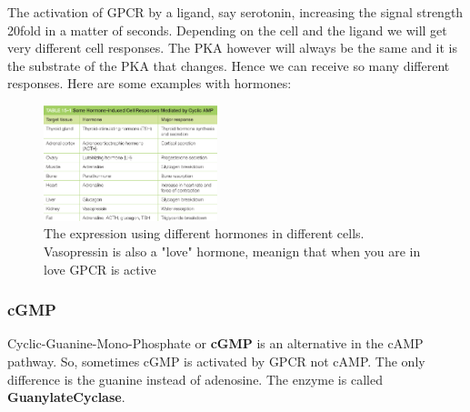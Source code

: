 \documentclass[../main.tex]{subfiles}
\begin{document}
The activation of \gls{GPCR} by a ligand, say serotonin, increasing the signal strength 20fold in a matter of seconds. Depending on the cell and the ligand we will get very different cell responses. The PKA however will always be the same and it is the substrate of the PKA that changes. Hence we can receive so many different responses. Here are some examples with hormones:
\begin{figure}[H]
	\centering
	\includegraphics[width=0.45\textwidth]{cAMP_horm}
	\caption{The expression using different hormones in different cells. Vasopressin is also a "love" hormone, meanign that when you are in love GPCR is active}
\end{figure}

\subsubsection{cGMP}

Cyclic-Guanine-Mono-Phosphate or \textbf{\gls{cGMP}} is an alternative in the cAMP pathway. So, sometimes cGMP is activated by GPCR not cAMP. The only difference is the guanine instead of adenosine. The enzyme is called \textbf{\gls{GuanylateCyclase}}. 
\end{document}
